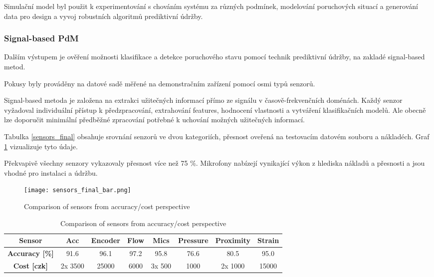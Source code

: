 Simulační model byl použit k experimentování s chováním systému za různých
podmínek, modelování poruchových situací a generování data pro design
a vyvoj robustních algoritmů prediktivní údržby.


\subsubsection{Signal-based PdM}
Dalším výstupem je ověření možnosti klasifikace a
detekce poruchového stavu pomocí technik prediktivní údržby,
na zakladé signal-based  metod. 

Pokusy byly prováděny na datové sadě měřené na demonstračním
zařízení pomocí osmi typů senzorů.
  
Signal-based metoda je založena na extrakci užitečných informací
přímo ze signálu v časově-frekvenčních doménách. Každý senzor vyžadoval
individuální přístup k předzpracování, extrahování features, hodnocení
vlastnosti a vytváření klasifikačních modelů. Ale obecně lze doporučit
minimální předběžné zpracování potřebné k uchování možných užitečných informací.

Tabulka \ref{sensors_final} obsahuje srovnání senzorů ve dvou 
kategoriích, přesnost oveřená na testovacím datovém souboru a nákladéch.
Graf \ref{fig:sensors_final_bar} vizualizuje tyto údaje.

Překvapivě všechny senzory vykazovaly přesnost více než 75 \%. Mikrofony
nabízejí vynikající výkon z hlediska nákladů a přesnosti a jsou
vhodné pro instalaci a údržbu.

\begin{figure}[h!]
    \centering
    \texttt{[image: sensors\_final\_bar.png]}
    \caption{Comparison of sensors from accuracy/cost perspective}
    \label{fig:sensors_final_bar}
\end{figure}

\begin{table}[h]
    \centering
    \begin{tabular}{|c|c|c|c|c|c|c|c|}
        \hline
        \textbf{Sensor}   & Acc & Encoder & Flow & Mics & Pressure & Proximity & Strain \\
        \hline
        \textbf{Accuracy [\%]} & 91.6 & 96.1 & 97.2 & 95.8 & 76.6 & 80.5 & 95.0 \\
        \hline
        \textbf{Cost [czk]} & 2x 3500 & 25000 & 6000 & 3x 500 & 1000 & 2x 1000 & 15000 \\
        \hline
    \end{tabular}
    \caption{Comparison of sensors from accuracy/cost perspective}
    \label{tab:sensors_final}
\end{table}

